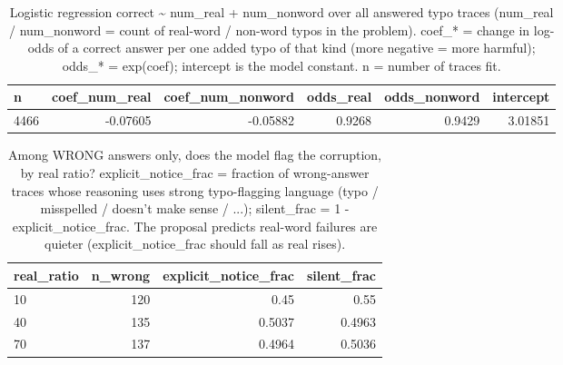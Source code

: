 \documentclass[11pt]{article}
\begin{document}
\begin{table}[H]
\centering
\caption{Logistic regression correct \textasciitilde{} num\_real + num\_nonword over all answered typo traces (num\_real / num\_nonword = count of real-word / non-word typos in the problem). coef\_* = change in log-odds of a correct answer per one added typo of that kind (more negative = more harmful); odds\_* = exp(coef); intercept is the model constant. n = number of traces fit.}
\small
\begin{adjustbox}{max width=\textwidth}
\begin{tabular}{lrrrrr}
\toprule
\textbf{n} & \textbf{coef\_num\_real} & \textbf{coef\_num\_nonword} & \textbf{odds\_real} & \textbf{odds\_nonword} & \textbf{intercept} \\
\midrule
4466 & -0.07605 & -0.05882 & 0.9268 & 0.9429 & 3.01851 \\
\bottomrule
\end{tabular}
\end{adjustbox}
\end{table}

\begin{table}[H]
\centering
\caption{Among WRONG answers only, does the model flag the corruption, by real ratio? explicit\_notice\_frac = fraction of wrong-answer traces whose reasoning uses strong typo-flagging language (typo / misspelled / doesn't make sense / ...); silent\_frac = 1 - explicit\_notice\_frac. The proposal predicts real-word failures are quieter (explicit\_notice\_frac should fall as real rises).}
\small
\begin{adjustbox}{max width=\textwidth}
\begin{tabular}{lrrr}
\toprule
\textbf{real\_ratio} & \textbf{n\_wrong} & \textbf{explicit\_notice\_frac} & \textbf{silent\_frac} \\
\midrule
10 & 120 & 0.45 & 0.55 \\
40 & 135 & 0.5037 & 0.4963 \\
70 & 137 & 0.4964 & 0.5036 \\
\bottomrule
\end{tabular}
\end{adjustbox}
\end{table}
\end{document}
